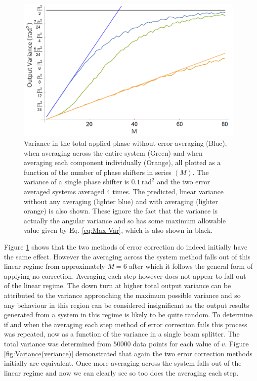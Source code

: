 \documentclass[aps,pra,twocolumn,superscriptaddress,numerical]{revtex4-1}
\begin{document}
		
		\begin{figure}
			\begin{centering}
				\includegraphics[width=\columnwidth]{phase_all.png}
				\par\end{centering}
			
			\caption[Variance of the total applied phase as a function of the number of components. ]{Variance in the total applied phase without error averaging (Blue), when averaging across the entire system (Green) and when averaging each component individually (Orange), all plotted as a function of the number of phase shifters in series $(M)$. The variance of a single phase shifter is $0.1\ \textrm{rad}^{2}$ and the two error averaged systems averaged 4 times. The predicted, linear variance without any averaging (lighter blue) and with averaging (lighter orange) is also shown. These ignore the fact that the variance is actually the angular variance and so has some maximum allowable value given by Eq. \ref{eq:Max Var}, which is also shown in black. \label{fig:Variance-in-phase all}}
			
			
		\end{figure}
		
		
		Figure \ref{fig:Variance-in-phase all} shows that the two methods 	of error correction do indeed initially have the same effect. However the averaging across the system method falls out of this linear regime from approximately $M=6$ after which it follows the general form of applying no correction. Averaging each step however does not appear to fall out of the linear regime. The down turn at higher total output variance can be attributed to the variance approaching the maximum possible variance and so any behaviour in this region can be considered insignificant as the output results generated from a system in this regime is likely to be quite random. To determine if and when the averaging each step method of error correction fails this process was repeated, now as a function of the variance in a single beam splitter. The total variance was determined from $50000$ data points for each value of $v$. Figure \ref{fig:Variance(veriance)} demonstrated that again the two error correction methods initially are equivalent. Once more averaging across the system falls out of the linear regime and now we can clearly see so too does the averaging each step.
		
\end{document}
